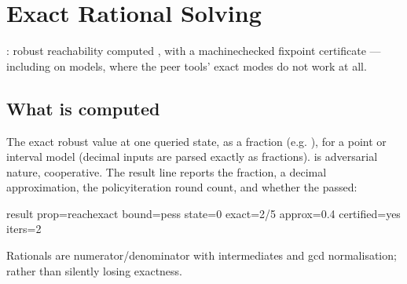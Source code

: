 \documentclass[a4paper,10pt,english]{sphinxmanual}
\begin{document}
\sphinxstepscope


\section{Exact Rational Solving}
\label{\detokenize{manual/exact:exact-rational-solving}}\label{\detokenize{manual/exact::doc}}
\sphinxAtStartPar
{}: robust reachability computed , with a
machine\sphinxhyphen{}checked fixpoint certificate — including on  models, where the peer
tools’ exact modes do not work at all.


\subsection{What is computed}
\label{\detokenize{manual/exact:what-is-computed}}
\sphinxAtStartPar
The exact robust value  at one queried state, as a fraction (e.g. ),
for a point or interval  model (decimal inputs are parsed exactly as
fractions).  is adversarial nature,  cooperative. The result line
reports the fraction, a decimal approximation, the policy\sphinxhyphen{}iteration round count, and
whether the  passed:

\begin{sphinxVerbatim}[commandchars=\\\{\}]
result  prop=reach\PYGZhy{}exact  bound=pess  state=0  exact=2/5  approx=0.4  certified=yes  iters=2
\end{sphinxVerbatim}

\sphinxAtStartPar
Rationals are  numerator/denominator with  intermediates and gcd
normalisation;  rather than silently losing exactness.
\end{document}
